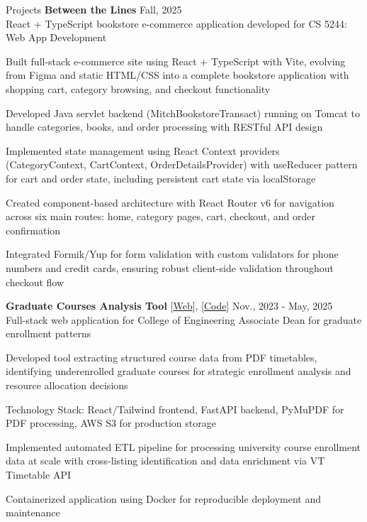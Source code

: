 \documentclass{resume}
\begin{document}
\begin{rSection}{Projects}
{\bf Between the Lines}{\hspace{2em}} \hfill {Fall, 2025} \\
React + TypeScript bookstore e-commerce application developed for CS 5244: Web App Development
\begin{cvitems}
    \item Built full-stack e-commerce site using React + TypeScript with Vite, evolving from Figma and static HTML/CSS into a complete bookstore application with shopping cart, category browsing, and checkout functionality
    \item Developed Java servlet backend (MitchBookstoreTransact) running on Tomcat to handle categories, books, and order processing with RESTful API design
    \item Implemented state management using React Context providers (CategoryContext, CartContext, OrderDetailsProvider) with useReducer pattern for cart and order state, including persistent cart state via localStorage
    \item Created component-based architecture with React Router v6 for navigation across six main routes: home, category pages, cart, checkout, and order confirmation
    \item Integrated Formik/Yup for form validation with custom validators for phone numbers and credit cards, ensuring robust client-side validation throughout checkout flow
\end{cvitems}

{\bf Graduate Courses Analysis Tool}{\hspace{2em} [\href{https://course-extractor-rior.onrender.com/}{Web}], [\href{https://github.com/mitchg10/course-extractor}{Code}]} \hfill {Nov., 2023 - May, 2025} \\
Full-stack web application for College of Engineering Associate Dean for graduate enrollment patterns
\begin{cvitems}
    \item Developed tool extracting structured course data from PDF timetables, identifying underenrolled graduate courses for strategic enrollment analysis and resource allocation decisions
    \item Technology Stack: React/Tailwind frontend, FastAPI backend, PyMuPDF for PDF processing, AWS S3 for production storage
    \item Implemented automated ETL pipeline for processing university course enrollment data at scale with cross-listing identification and data enrichment via VT Timetable API
    \item Containerized application using Docker for reproducible deployment and maintenance
\end{cvitems}


\end{rSection}
\end{document}
